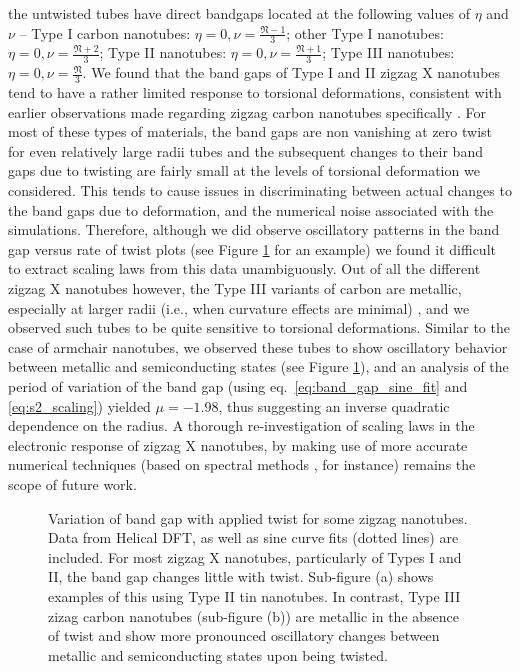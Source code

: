 \documentclass[preprint,12pt, 3p, sort&compress]{elsarticle}
\begin{document}
the untwisted tubes have direct bandgaps located at the following values of $\eta$ and $\nu$ -- Type I carbon nanotubes: $\eta = 0, \nu = \frac{\mathfrak{N}-1}{3}$; other Type I nanotubes: $\eta = 0, \nu = \frac{\mathfrak{N}+2}{3}$; Type II nanotubes: $\eta = 0, \nu = \frac{\mathfrak{N}+1}{3}$; Type III nanotubes: $\eta = 0, \nu = \frac{\mathfrak{N}}{3}$. We  found that the band gaps of Type I and II zigzag X nanotubes tend to have a rather limited response to torsional deformations, consistent with earlier observations made regarding zigzag carbon nanotubes specifically \citep{yang2000electronic, ding2002analytical, yang1999band}. For most of these types of materials, the band gaps are non vanishing at zero twist for even relatively large radii tubes and the subsequent changes to their band gaps due to twisting are fairly small at the levels of torsional deformation we considered. This tends to cause issues in discriminating between actual changes to the band gaps due to deformation, and the numerical noise associated with the simulations. Therefore, although we did observe oscillatory patterns in the band gap versus rate of twist plots (see Figure \ref{fig:zigzag_twist_data} for an example) we found it difficult to extract scaling laws from this data unambiguously. Out of all the different zigzag X nanotubes however, the Type III variants of carbon are metallic, especially at larger radii (i.e., when curvature effects are minimal) \citep{ghosh2019symmetry, ouyang2001energy}, and we observed such tubes to be quite sensitive to torsional deformations. Similar to the case of armchair nanotubes, we observed these tubes to show oscillatory behavior between metallic and semiconducting states (see Figure \ref{fig:zigzag_twist_data}), and an analysis of the period of variation of the band gap (using eq.~\ref{eq:band_gap_sine_fit} and \ref{eq:s2_scaling}) yielded $\mu = -1.98$, thus suggesting an inverse quadratic dependence on the radius. A thorough re-investigation of scaling laws in the electronic response of zigzag X nanotubes, by making use of more accurate numerical techniques (based on spectral methods \citep{My_Shivang_HelicES_paper, agarwal2021spectral}, for instance) remains the scope of future work.
\begin{figure}[!ht]
\centering
{}\quad
{}
\caption{Variation of band gap with applied twist for some zigzag nanotubes. Data from Helical DFT, as well as sine curve fits (dotted lines) are included. For most zigzag X nanotubes, particularly of Types I and II, the band gap changes little with twist. Sub-figure (a) shows examples of this using Type II tin nanotubes. In contrast, Type III zizag carbon nanotubes (sub-figure (b)) are metallic in the absence of twist and show more pronounced oscillatory changes between metallic and semiconducting states upon being twisted.}
\label{fig:zigzag_twist_data}
\end{figure}
\end{document}
